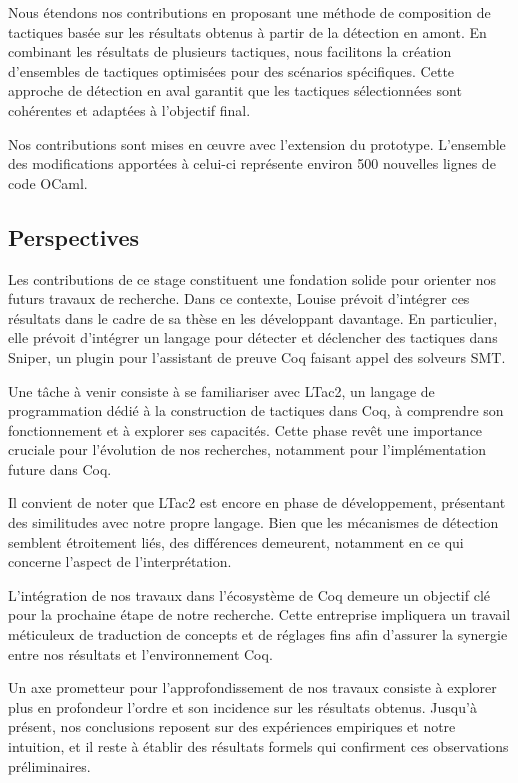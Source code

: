 \documentclass[french,titlepage]{article}
\begin{document}
Nous étendons nos contributions en proposant une méthode de composition de tactiques basée sur les résultats obtenus à partir de la détection en amont. En combinant les résultats de plusieurs tactiques, nous facilitons la création d'ensembles de tactiques optimisées pour des scénarios spécifiques. Cette approche de détection en aval garantit que les tactiques sélectionnées sont cohérentes et adaptées à l'objectif final.

Nos contributions sont mises en œuvre avec l'extension du prototype. L'ensemble des modifications apportées à celui-ci représente environ 500 nouvelles lignes de code OCaml.

\subsection{Perspectives} \label{conclusion:perspectives}
Les contributions de ce stage constituent une fondation solide pour orienter nos futurs travaux de recherche. Dans ce contexte, Louise prévoit d'intégrer ces résultats dans le cadre de sa thèse en les développant davantage. En particulier, elle prévoit d'intégrer un langage pour détecter et déclencher des tactiques dans Sniper, un plugin pour l'assistant de preuve Coq faisant appel des solveurs SMT.

Une tâche à venir consiste à se familiariser avec LTac2, un langage de programmation dédié à la construction de tactiques dans Coq, à comprendre son fonctionnement et à explorer ses capacités. Cette phase revêt une importance cruciale pour l'évolution de nos recherches, notamment pour l'implémentation future dans Coq.

Il convient de noter que LTac2 est encore en phase de développement, présentant des similitudes avec notre propre langage. Bien que les mécanismes de détection semblent étroitement liés, des différences demeurent, notamment en ce qui concerne l'aspect de l'interprétation.

L'intégration de nos travaux dans l'écosystème de Coq demeure un objectif clé pour la prochaine étape de notre recherche. Cette entreprise impliquera un travail méticuleux de traduction de concepts et de réglages fins afin d'assurer la synergie entre nos résultats et l'environnement Coq.

Un axe prometteur pour l'approfondissement de nos travaux consiste à explorer plus en profondeur l'ordre et son incidence sur les résultats obtenus. Jusqu'à présent, nos conclusions reposent sur des expériences empiriques et notre intuition, et il reste à établir des résultats formels qui confirment ces observations préliminaires.
\end{document}

